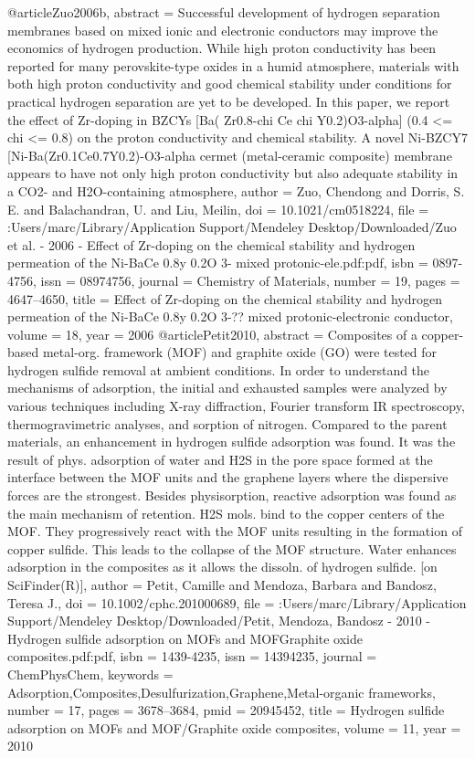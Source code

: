 @article{Zuo2006b,
abstract = {Successful development of hydrogen separation membranes based on mixed ionic and electronic conductors may improve the economics of hydrogen production. While high proton conductivity has been reported for many perovskite-type oxides in a humid atmosphere, materials with both high proton conductivity and good chemical stability under conditions for practical hydrogen separation are yet to be developed. In this paper, we report the effect of Zr-doping in BZCYs [Ba( Zr0.8-chi Ce chi Y0.2)O3-alpha] (0.4 {\textless}= chi {\textless}= 0.8) on the proton conductivity and chemical stability. A novel Ni-BZCY7 [Ni-Ba(Zr0.1Ce0.7Y0.2)-O3-alpha cermet (metal-ceramic composite) membrane appears to have not only high proton conductivity but also adequate stability in a CO2- and H2O-containing atmosphere},
author = {Zuo, Chendong and Dorris, S. E. and Balachandran, U. and Liu, Meilin},
doi = {10.1021/cm0518224},
file = {:Users/marc/Library/Application Support/Mendeley Desktop/Downloaded/Zuo et al. - 2006 - Effect of Zr-doping on the chemical stability and hydrogen permeation of the Ni-BaCe 0.8y 0.2O 3- mixed protonic-ele.pdf:pdf},
isbn = {0897-4756},
issn = {08974756},
journal = {Chemistry of Materials},
number = {19},
pages = {4647--4650},
title = {{Effect of Zr-doping on the chemical stability and hydrogen permeation of the Ni-BaCe 0.8y 0.2O 3-?? mixed protonic-electronic conductor}},
volume = {18},
year = {2006}
}
@article{Petit2010,
abstract = {Composites of a copper-based metal-org. framework (MOF) and graphite oxide (GO) were tested for hydrogen sulfide removal at ambient conditions.  In order to understand the mechanisms of adsorption, the initial and exhausted samples were analyzed by various techniques including X-ray diffraction, Fourier transform IR spectroscopy, thermogravimetric analyses, and sorption of nitrogen.  Compared to the parent materials, an enhancement in hydrogen sulfide adsorption was found.  It was the result of phys. adsorption of water and H2S in the pore space formed at the interface between the MOF units and the graphene layers where the dispersive forces are the strongest.  Besides physisorption, reactive adsorption was found as the main mechanism of retention.  H2S mols. bind to the copper centers of the MOF.  They progressively react with the MOF units resulting in the formation of copper sulfide.  This leads to the collapse of the MOF structure.  Water enhances adsorption in the composites as it allows the dissoln. of hydrogen sulfide. [on SciFinder(R)]},
author = {Petit, Camille and Mendoza, Barbara and Bandosz, Teresa J.},
doi = {10.1002/cphc.201000689},
file = {:Users/marc/Library/Application Support/Mendeley Desktop/Downloaded/Petit, Mendoza, Bandosz - 2010 - Hydrogen sulfide adsorption on MOFs and MOFGraphite oxide composites.pdf:pdf},
isbn = {1439-4235},
issn = {14394235},
journal = {ChemPhysChem},
keywords = {Adsorption,Composites,Desulfurization,Graphene,Metal-organic frameworks},
number = {17},
pages = {3678--3684},
pmid = {20945452},
title = {{Hydrogen sulfide adsorption on MOFs and MOF/Graphite oxide composites}},
volume = {11},
year = {2010}
}
